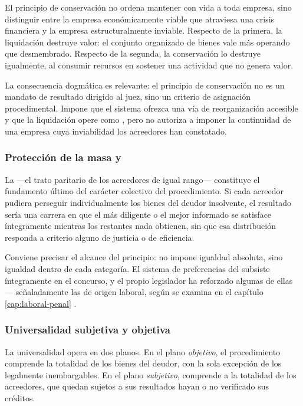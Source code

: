 El principio de conservación no ordena mantener con vida a toda empresa, sino distinguir
entre la empresa económicamente viable que atraviesa una crisis financiera y la empresa
estructuralmente inviable. Respecto de la primera, la liquidación destruye valor: el
conjunto organizado de bienes vale más operando que desmembrado. Respecto de la segunda,
la conservación lo destruye igualmente, al consumir recursos en sostener una actividad
que no genera valor.

La consecuencia dogmática es relevante: el principio de conservación no es un mandato de
resultado dirigido al juez, sino un criterio de asignación procedimental. Impone que el
sistema ofrezca una vía de reorganización accesible y que la liquidación opere como
, pero no autoriza a imponer la continuidad de una empresa cuya
inviabilidad los acreedores han constatado.

\subsubsection{Protección de la masa y }

La  ---el trato paritario de los acreedores de igual
rango--- constituye el fundamento último del carácter colectivo del procedimiento. Si
cada acreedor pudiera perseguir individualmente los bienes del deudor insolvente, el
resultado sería una carrera en que el más diligente o el mejor informado se satisface
íntegramente mientras los restantes nada obtienen, sin que esa distribución responda a
criterio alguno de justicia o de eficiencia.

Conviene precisar el alcance del principio: no impone igualdad absoluta, sino igualdad
dentro de cada categoría. El sistema de preferencias del  \citeyearpar{codigo-civil} subsiste
íntegramente en el concurso, y el propio legislador ha reforzado algunas de ellas ---
señaladamente las de origen laboral, según se examina en el capítulo
\ref{cap:laboral-penal} \parencite{doc-proteccion-trabajadores}.

\subsubsection{Universalidad subjetiva y objetiva}

La universalidad opera en dos planos. En el plano \emph{objetivo}, el procedimiento
comprende la totalidad de los bienes del deudor, con la sola excepción de los legalmente
inembargables. En el plano \emph{subjetivo}, comprende a la totalidad de los acreedores,
que quedan sujetos a sus resultados hayan o no verificado sus créditos.

